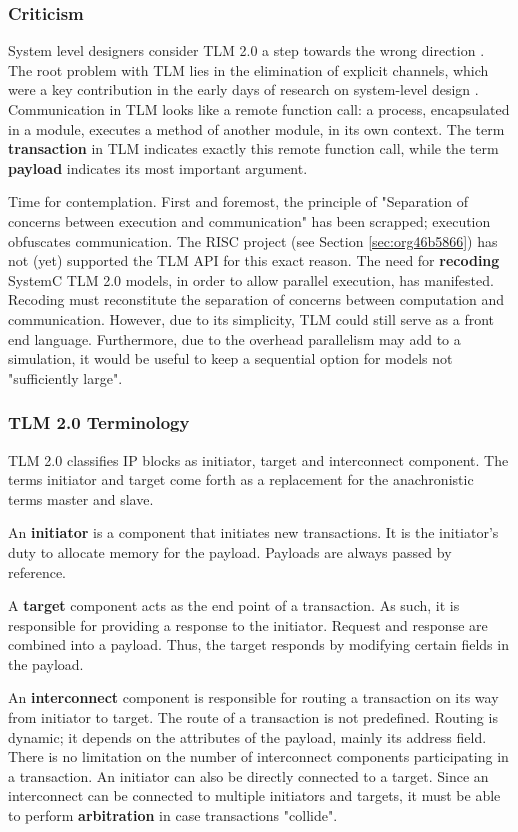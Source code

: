 \documentclass[11pt]{article}
\begin{document}
\subsubsection{Criticism}
\label{sec:org0f07a23}
System level designers consider TLM 2.0 a step towards the wrong direction \cite{Liu2015}.
The root problem with TLM lies in the elimination of explicit channels, which were a key contribution in the early days of research on system-level design \cite{Liu2015}.
Communication in TLM looks like a remote function call\cite{Ecker2009}: a process, encapsulated in a module, executes a method of another module, in its own context.
The term \textbf{transaction} in TLM indicates exactly this remote function call, while the term \textbf{payload} indicates its most important argument.

Time for contemplation.
First and foremost, the principle of "Separation of concerns between execution and communication" has been scrapped; execution obfuscates communication.
The RISC project (see Section \ref{sec:org46b5866}) has not (yet) supported the TLM API for this exact reason.
The need for \textbf{recoding} SystemC TLM 2.0 models, in order to allow parallel execution, has manifested. 
Recoding must reconstitute the separation of concerns between computation and communication.
However, due to its simplicity, TLM could still serve as a front end language.
Furthermore, due to the overhead parallelism may add to a simulation, it would be useful to keep a sequential option for models not "sufficiently large".

\subsubsection{TLM 2.0 Terminology}
\label{sec:org035aa1f}
TLM 2.0 classifies IP blocks as initiator, target and interconnect component.
The terms initiator and target come forth as a replacement for the anachronistic terms master and slave.

An \textbf{initiator} is a component that initiates new transactions.
It is the initiator's duty to allocate memory for the payload.
Payloads are always passed by reference.

A \textbf{target} component acts as the end point of a transaction. 
As such, it is responsible for providing a response to the initiator.
Request and response are combined into a payload.
Thus, the target responds by modifying certain fields in the payload.

An \textbf{interconnect} component is responsible for routing a transaction on its way from initiator to target.
The route of a transaction is not predefined.
Routing is dynamic; it depends on the attributes of the payload, mainly its address field.
There is no limitation on the number of interconnect components participating in a transaction. 
An initiator can also be directly connected to a target.
Since an interconnect can be connected to multiple initiators and targets, it must be able to perform \textbf{arbitration} in case transactions "collide".
\end{document}
